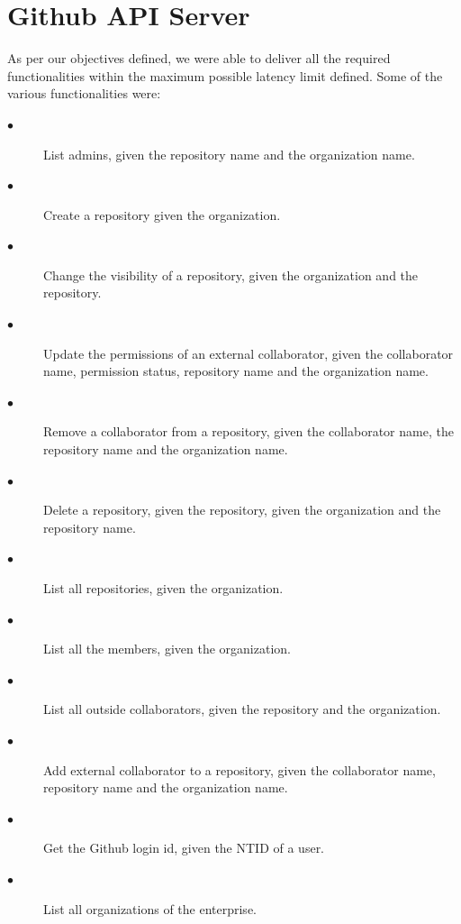 \section{Github API Server}
As per our objectives defined, we were able to deliver all the required functionalities within the maximum possible latency limit defined. Some of the various functionalities were:
\begin{description}

\item[$\bullet$] List admins, given the repository name and the organization name.

\item[$\bullet$] Create a repository given the organization.

\item[$\bullet$] Change the visibility of a repository, given the organization and the repository.

\item[$\bullet$] Update the permissions of an external collaborator, given the collaborator name, permission status, repository name and the organization name.

\item[$\bullet$] Remove a collaborator from a repository, given the collaborator name, the repository name and the organization name.

\item[$\bullet$] Delete a repository, given the repository, given the organization and the repository name.

\item[$\bullet$] List all repositories, given the organization.

\item[$\bullet$] List all the members, given the organization.

\item[$\bullet$] List all outside collaborators, given the repository and the organization.

\item[$\bullet$] Add external collaborator to a repository, given the collaborator name, repository name and the organization name.

\item[$\bullet$] Get the Github login id, given the NTID of a user.

\item[$\bullet$] List all organizations of the enterprise.

\end{description}

